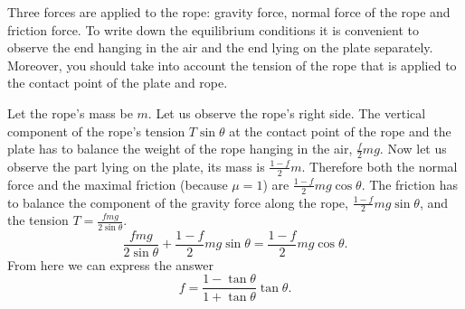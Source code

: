 {\ifEngHint
Three forces are applied to the rope: gravity force, normal force of the rope and friction force. To write down the equilibrium conditions it is convenient to observe the end hanging in the air and the end lying on the plate separately.  Moreover, you should take into account the tension of the rope that is applied to the contact point of the plate and rope.
\fi


\ifEngSolution
Let the rope’s mass be $m$. Let us observe the rope’s right side. The vertical component of the rope’s tension $T \sin \theta$ at the contact point of the rope and the plate has to balance the weight of the rope hanging in the air, $\frac{f}{2}mg$. Now let us observe the part lying on the plate, its mass is $\frac{1-f}{2}m$. Therefore both the normal force and the maximal friction (because $\mu = 1$) are $\frac{1-f}{2}mg \cos \theta$. The friction has to balance the component of the gravity force along the rope, $\frac{1-f}{2}mg \sin \theta$, and the tension $T=\frac{f m g}{2 \sin \theta}$. 
$$\frac{f m g}{2 \sin \theta} + \frac{1-f}{2}mg \sin \theta = \frac{1-f}{2}mg \cos \theta.$$
From here we can express the answer
$$f = \frac{1-\tan \theta}{1+\tan \theta} \tan \theta. $$
\fi
}